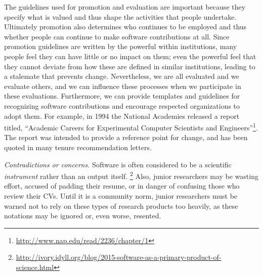 \documentclass[a4paper,UKenglish]{dagman}
\begin{document}
The guidelines used for promotion and evaluation are important because they specify what is valued and thus shape the activities that people undertake. Ultimately promotion also determines who continues to be employed and thus whether people can continue to make software contributions at all. Since promotion guidelines are written by the powerful within institutions, many people feel they can have little or no impact on them; even the powerful feel that they cannot deviate from how these are defined in similar institutions, leading to a stalemate that prevents change.
Nevertheless, we are all evaluated and we evaluate others, and we can influence these processes when we participate in these evaluations.
Furthermore, we can provide templates and guidelines for recognizing software contributions and encourage respected organizations to adopt them.
For example, in 1994 the National Academies released a report titled, ``Academic Careers for Experimental Computer Scientists and Engineers''\footnote{\url{http://www.nap.edu/read/2236/chapter/1}}. The report was intended to provide a reference point for change, and has been quoted in many tenure recommendation letters.


\emph{Contradictions or concerns.}
Software is often considered to be a scientific \emph{instrument} rather than an output itself.%
\footnote{\url{http://ivory.idyll.org/blog/2015-software-as-a-primary-product-of-science.html}}
Also, junior researchers may be  wasting effort, accused of padding their resume, or in danger of confusing those who review their CVs. Until it is a community norm, junior researchers must be warned not to rely on these types of research products too heavily, as these notations may be ignored or, even worse, resented.
\end{document}
